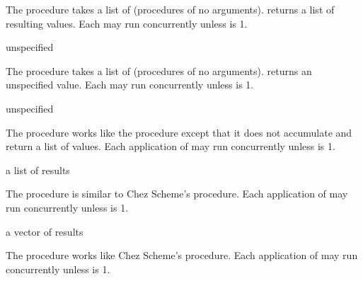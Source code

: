 The  procedure takes a list of 
(procedures of no arguments).  returns a list
of resulting values. Each  may run concurrently unless
 is 1.

\begin{procedure}
\end{procedure}
\returns{} unspecified

The  procedure takes a list of 
(procedures of no arguments).  returns an
unspecified value. Each  may run concurrently unless
 is 1.

\begin{procedure}
\end{procedure}
\returns{} unspecified

The  procedure works like the
 procedure except that it does not accumulate and
return a list of values. Each application of  may run
concurrently unless  is 1.

\begin{procedure}
\end{procedure}
\returns{} a list of results

The  procedure is similar to Chez Scheme's
 procedure. Each application of  may run
concurrently unless  is 1.

\begin{procedure}
\end{procedure}
\returns{} a vector of results

The  procedure works like Chez Scheme's
 procedure. Each application of  may
run concurrently unless  is 1.
